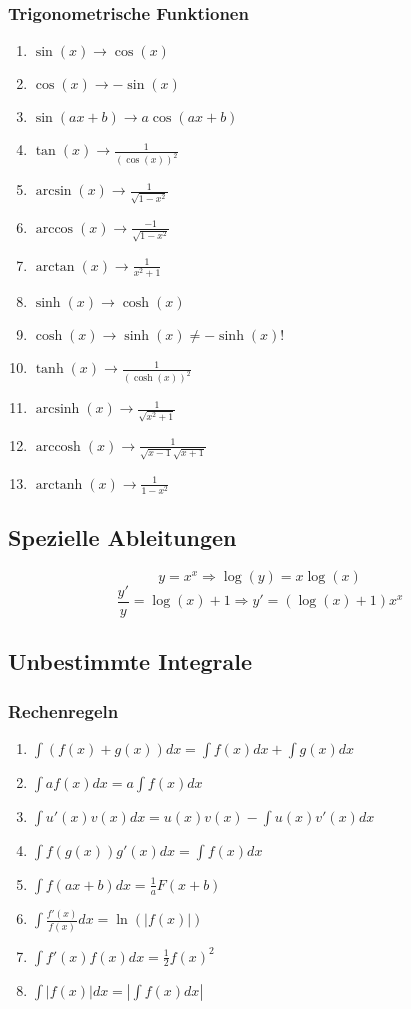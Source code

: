 \documentclass[a4paper, 9pt, DIV=24]{scrartcl}
\DeclareMathOperator{\arcsinh}{arcsinh}
\DeclareMathOperator{\arccosh}{arccosh}
\DeclareMathOperator{\arctanh}{arctanh}
\begin{document}
\subsubsection{Trigonometrische Funktionen}
\begin{enumerate}[label={(}\arabic*{)}]
 \item $\sin(x) \rightarrow \cos(x)$
 \item $\cos(x) \rightarrow -\sin(x)$
 \item $\sin(ax+b) \rightarrow a\cos(ax+b)$
 \item $\tan(x) \rightarrow \frac{1}{(\cos(x))^2}$
 \item $\arcsin(x) \rightarrow \frac{1}{\sqrt{1-x^2}}$
 \item $\arccos(x) \rightarrow \frac{-1}{\sqrt{1-x^2}}$
 \item $\arctan(x) \rightarrow \frac{1}{x^2+1}$
 \item $\sinh(x) \rightarrow \cosh(x)$
 \item $\cosh(x) \rightarrow \sinh(x) \neq -\sinh(x)$!
 \item $\tanh(x) \rightarrow \frac{1}{(\cosh(x))^2}$
 \item $\arcsinh(x) \rightarrow \frac{1}{\sqrt{x^2+1}}$
 \item $\arccosh(x) \rightarrow \frac{1}{\sqrt{x-1}\sqrt{x+1}}$
 \item $\arctanh(x) \rightarrow \frac{1}{1-x^2}$
\end{enumerate}
\subsection*{Spezielle Ableitungen}
$$y=x^x \Rightarrow \log (y) = x\log (x)$$
$$ \frac{y'}{y} = \log (x) + 1 \Rightarrow y'=(\log(x)+1)x^x$$

\subsection{Unbestimmte Integrale}
\subsubsection{Rechenregeln}
\begin{enumerate}[label={(}\arabic*{)}]
 \item $\int(f(x)+g(x))dx = \int f(x)dx + \int g(x)dx$
 \item $\int af(x)dx = a\int f(x)dx$
 \item $\int u'(x)v(x)dx = u(x)v(x) - \int u(x)v'(x)dx$
 \item $\int f(g(x))g'(x)dx = \int f(x)dx$
 \item $\int f(ax+b)dx = \frac{1}{a}F(x+b)$
 \item $\int \frac{f'(x)}{f(x)}dx = \ln(|f(x)|)$
 \item $\int f'(x)f(x)dx = \frac{1}{2}f(x)^2$
 \item $\int |f(x)|dx = |\int f(x)dx|$
\end{enumerate}
\end{document}
